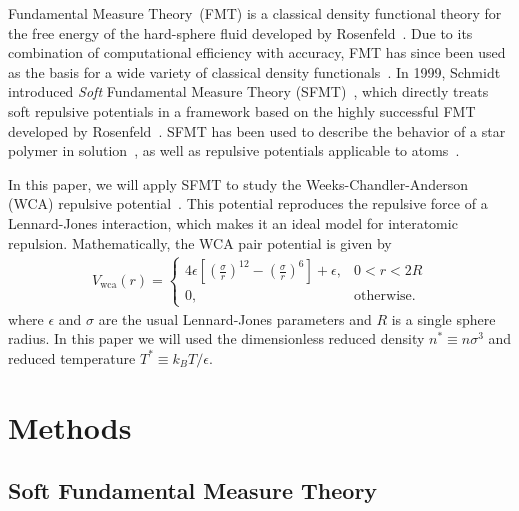 \documentclass[letterpaper,twocolumn,amsmath,amssymb,prb]{revtex4-1}
\begin{document}
Fundamental Measure Theory~(FMT) is a classical density functional
theory for the free energy of the hard-sphere fluid developed by
Rosenfeld~\cite{rosenfeld1989}.  Due to its combination of
computational efficiency with accuracy, FMT has since been used as the
basis for a wide variety of classical density
functionals~\cite{cuesta1997dimensional, hansen2009fundamental,
  marechal2013density}.
%
In 1999, Schmidt introduced \emph{Soft} Fundamental Measure Theory
(SFMT)~\cite{schmidt1999density}, which directly treats soft repulsive
potentials in a framework based on the highly successful FMT developed
by Rosenfeld~\cite{rosenfeld1989}.  SFMT has been used to describe the
behavior of a star polymer in solution~\cite{schmidt2000density,
  groh2001density, kim2001adsorption, sweatman2002fundamental}, as
well as repulsive potentials applicable to
atoms~\cite{schmidt2000fluid, sweatman2002fundamental}.


In this paper, we will apply SFMT to study the Weeks-Chandler-Anderson
(WCA) repulsive potential~\cite{weeks1971}.  This potential reproduces
the repulsive force of a Lennard-Jones interaction, which makes it an
ideal model for interatomic repulsion.  Mathematically, the WCA
pair potential is given by
\newcommand\erf{\mathrm{erf}}
\newcommand\Vwca{V_{\mathrm{wca}}}
\newcommand\Verf{V_{\erf}}
\begin{align}
  \Vwca(r) =
  \begin{cases}
    4\epsilon \left[ \left(\frac{\sigma}{r}\right)^{12} -
    \left(\frac{\sigma}{r}\right)^{6} \right] + \epsilon, & 0 < r < 2R \\
    0, & \textrm{otherwise}.
  \end{cases}
\end{align}
where $\epsilon$ and $\sigma$ are the usual Lennard-Jones parameters
and $R$ is a single sphere radius.  In this paper we will used the
dimensionless reduced density $n^* \equiv n \sigma^3$ and reduced
temperature $T^* \equiv k_BT/\epsilon$.

\section{Methods}

\subsection{Soft Fundamental Measure Theory}
\end{document}
